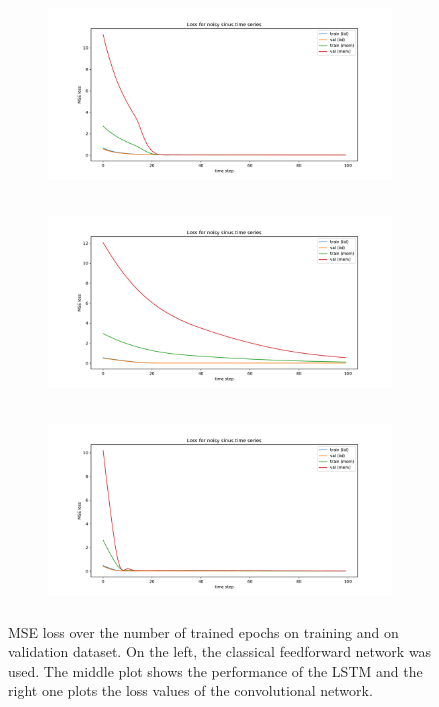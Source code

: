 \documentclass{article}
\begin{document}
\begin{figure}
  \center
  \begin{subfigure}{\textwidth}
    \centering
    \includegraphics[height=5cm]{figures/plot_twolayer_losscompare.pdf}
  \end{subfigure}
  \begin{subfigure}{\textwidth}
    \centering
    \includegraphics[height=5cm]{figures/plot_lstm_losscompare.pdf}
  \end{subfigure}
  \begin{subfigure}{\textwidth}
    \centering
    \includegraphics[height=5cm]{figures/plot_cnn_losscompare.pdf}
  \end{subfigure}
  \caption{MSE loss over the number of trained epochs on training and on
    validation dataset. On the left, the classical feedforward network was used.
    The middle plot shows the performance of the LSTM and the right one plots the
    loss values of the convolutional network.}
  \label{fig:noise_loss_impact}
\end{figure}
\end{document}
